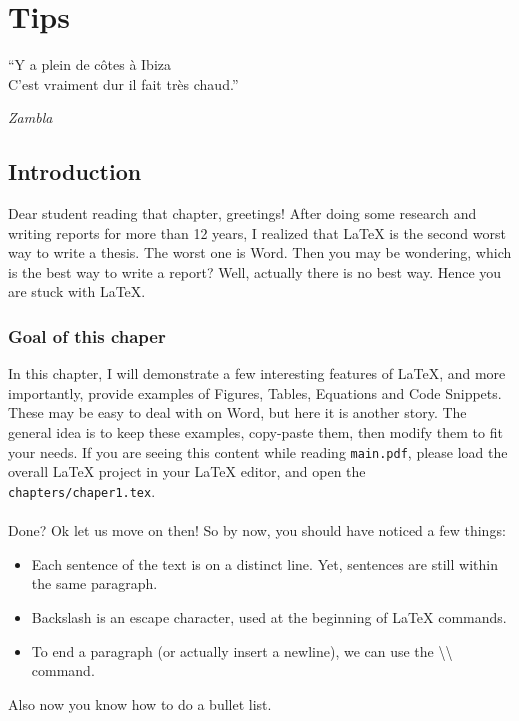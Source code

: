 
\chapter{Tips} %

\epigraph{``Y a plein de c\^otes \`a Ibiza\\C'est vraiment dur il fait tr\`es chaud.''}{\textit{Zambla}}

\label{chapter2} %

\section{Introduction}
Dear student reading that chapter, greetings!
After doing some research and writing reports for more than 12 years, I realized that LaTeX is the second worst way to write a thesis.
The worst one is Word.
Then you may be wondering, which is the best way to write a report?
Well, actually there is no best way.
Hence you are stuck with LaTeX.

\subsection{Goal of this chaper}
In this chapter, I will demonstrate a few interesting features of LaTeX, and more importantly, provide examples of Figures, Tables, Equations and Code Snippets.
These may be easy to deal with on Word, but here it is another story.
The general idea is to keep these examples, copy-paste them, then modify them to fit your needs.
If you are seeing this content while reading \texttt{main.pdf}, please load the overall LaTeX project in your LaTeX editor, and open the \texttt{chapters/chaper1.tex}.
\\
\\
Done?
Ok let us move on then!
So by now, you should have noticed a few things:
\begin{itemize}
  \item Each sentence of the text is on a distinct line. Yet, sentences are still within the same paragraph.
  \item Backslash is an escape character, used at the beginning of LaTeX commands.
  \item To end a paragraph (or actually insert a newline), we can use the \textbackslash{}\textbackslash{} command.
\end{itemize}
Also now you know how to do a bullet list.

